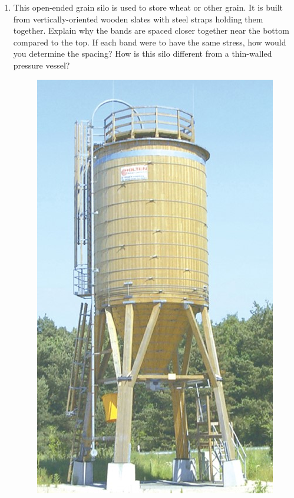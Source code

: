 \documentclass[12pt, oneside]{article}
\begin{document}
\begin{enumerate}
	\item %
		This open-ended grain silo is used to store wheat or other grain.
		It is built from vertically-oriented wooden slates with steel straps holding them together.
		Explain why the bands are spaced closer together near the bottom compared to the top.
		If each band were to have the same stress, how would you determine the spacing?
		How is this silo different from a thin-walled pressure vessel?
		\begin{figure}[H]
			\centering
			\includegraphics[width=0.6\linewidth]{C8-2}
		\end{figure}

\end{enumerate}
\end{document}
